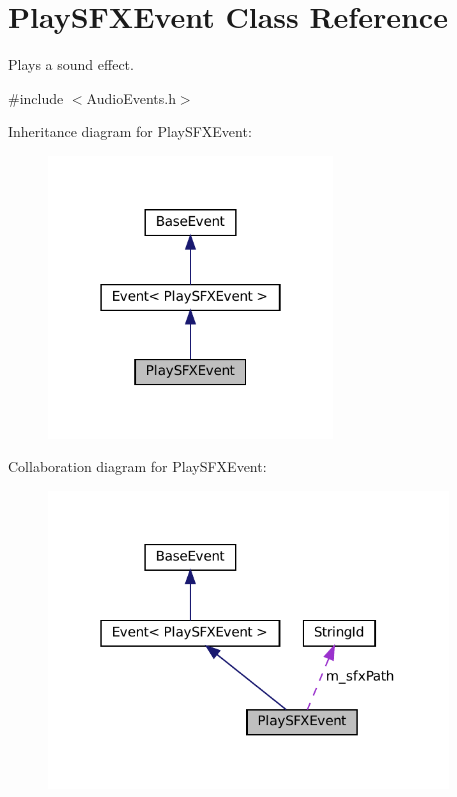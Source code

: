 \hypertarget{classPlaySFXEvent}{}\section{Play\+S\+F\+X\+Event Class Reference}
\label{classPlaySFXEvent}


Plays a sound effect.  




{\ttfamily \#include $<$Audio\+Events.\+h$>$}



Inheritance diagram for Play\+S\+F\+X\+Event\+:
\nopagebreak
\begin{figure}[H]
\begin{center}
\leavevmode
\includegraphics[width=214pt]{classPlaySFXEvent__inherit__graph}
\end{center}
\end{figure}


Collaboration diagram for Play\+S\+F\+X\+Event\+:
\nopagebreak
\begin{figure}[H]
\begin{center}
\leavevmode
\includegraphics[width=301pt]{classPlaySFXEvent__coll__graph}
\end{center}
\end{figure}
